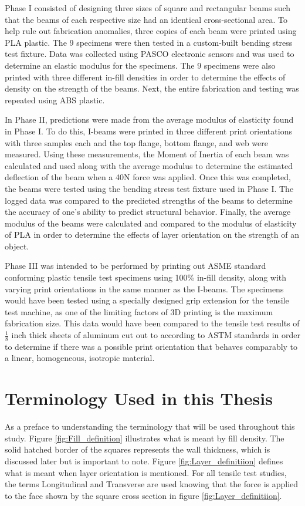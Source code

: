	Phase I consisted of designing three sizes of square and rectangular beams such that the beams of each respective size had an identical cross-sectional area. To help rule out fabrication anomalies, three copies of each beam were printed using PLA plastic. The 9 specimens were then tested in a custom-built bending stress test fixture. Data was collected using PASCO electronic sensors and was used to determine an elastic modulus for the specimens. The 9 specimens were also printed with three different in-fill densities in order to determine the effects of density on the strength of the beams. Next, the entire fabrication and testing was repeated using ABS plastic.\par
	In Phase II, predictions were made from the average modulus of elasticity found in Phase I. To do this, I-beams were printed in three different print orientations with three samples each and the top flange, bottom flange, and web were measured. Using these measurements, the Moment of Inertia of each beam was calculated and used along with the average modulus to determine the estimated deflection of the beam when a 40N force was applied. Once this was completed, the beams were tested using the bending stress test fixture used in Phase I. The logged data was compared to the predicted strengths of the beams to determine the accuracy of one's ability to predict structural behavior. Finally, the average modulus of the beams were calculated and compared to the modulus of elasticity of PLA in order to determine the effects of layer orientation on the strength of an object.\par	
	Phase III was intended to be performed by printing out ASME standard conforming plastic tensile test specimens using 100\% in-fill density, along with varying print orientations in the same manner as the I-beams. The specimens would have been tested using a specially designed grip extension for the tensile test machine, as one of the limiting factors of 3D printing is the maximum fabrication size. This data would have been compared to the tensile test results of $\frac{1}{8}$ inch thick sheets of aluminum cut out to according to ASTM standards in order to determine if there was a possible print orientation that behaves comparably to a linear, homogeneous, isotropic material.
	
\section{Terminology Used in this Thesis}
	As a preface to understanding the terminology that will be used throughout this study. Figure \ref{fig:Fill_definition} illustrates what is meant by fill density. The solid hatched border of the squares represents the wall thickness, which is discussed later but is important to note. Figure \ref{fig:Layer_definitiion} defines what is meant when layer orientation is mentioned. For all tensile test studies, the terms Longitudinal and Transverse are used knowing that the force is applied to the face shown by the square cross section in figure \ref{fig:Layer_definitiion}.


